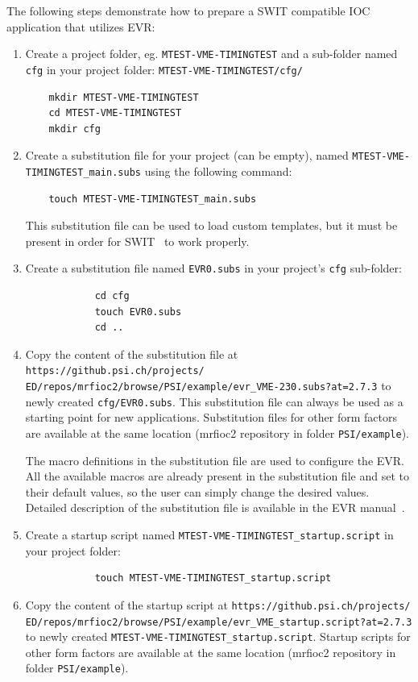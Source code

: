 \documentclass[12pt,a4paper]{article}
\newcommand{\latestDriverVersion}{2.7.3}
\begin{document}
The following steps demonstrate how to prepare a SWIT compatible IOC application that utilizes EVR:
\begin{enumerate}

	\item Create a project folder, eg. \texttt{MTEST-VME-TIMINGTEST} and a sub-folder named \texttt{cfg} in your project folder: \texttt{MTEST-VME-TIMINGTEST/cfg/}
\begin{verbatim}
	mkdir MTEST-VME-TIMINGTEST
	cd MTEST-VME-TIMINGTEST
	mkdir cfg
\end{verbatim}

	\item Create a substitution file for your project (can be empty), named \texttt{MTEST-VME-TIMINGTEST\_main.subs} using the following command: 
\begin{verbatim}
	touch MTEST-VME-TIMINGTEST_main.subs
\end{verbatim}	
	This substitution file can be used to load custom templates, but it must be present in order for SWIT~\cite{swit} to work properly.
	
	\item 
		Create a substitution file named \texttt{EVR0.subs} in your project's \texttt{cfg} sub-folder:
		\begin{verbatim}
			cd cfg
			touch EVR0.subs
			cd ..
		\end{verbatim}
	\item Copy the content of the substitution file  at \texttt{https://github.psi.ch/projects/} \texttt{ED/repos/mrfioc2/browse/PSI/example/evr\_VME-230.subs?at=\latestDriverVersion} to newly created \texttt{cfg/EVR0.subs}. This substitution file can always be used as a starting point for new applications. Substitution files for other form factors are available at the same location (mrfioc2 repository in folder \texttt{PSI/example}).
	
	The macro definitions in the substitution file are used to configure the EVR. All the available macros are already present in the substitution file and set to their default values, so the user can simply change the desired values. Detailed description of the substitution file is available in the EVR manual~\cite{evr_manual}.

	\item 
		Create a startup script named \texttt{MTEST-VME-TIMINGTEST\_startup.script} in your project folder:
		\begin{verbatim}
			touch MTEST-VME-TIMINGTEST_startup.script
		\end{verbatim}
	\item 
		Copy the content of the startup script at \texttt{https://github.psi.ch/projects/} \texttt{ED/repos/mrfioc2/browse/PSI/example/evr\_VME\_startup.script?at=\latestDriverVersion} to newly created \texttt{MTEST-VME-TIMINGTEST\_startup.script}. Startup scripts for other form factors are available at the same location (mrfioc2 repository in folder \texttt{PSI/example}).


\end{enumerate}
\end{document}

